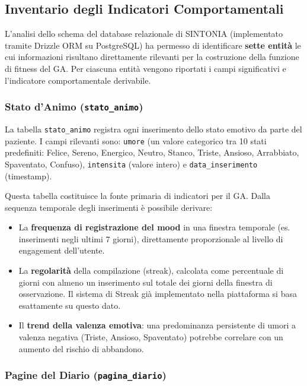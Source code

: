 \subsection{Inventario degli Indicatori Comportamentali}
\label{subsec:inventario_indicatori}

L'analisi dello schema del database relazionale di SINTONIA (implementato tramite Drizzle ORM su PostgreSQL) ha permesso di identificare \textbf{sette entità} le cui informazioni risultano direttamente rilevanti per la costruzione della funzione di fitness del GA. Per ciascuna entità vengono riportati i campi significativi e l'indicatore comportamentale derivabile.

\subsubsection{Stato d'Animo (\texttt{stato\_animo})}

La tabella \texttt{stato\_animo} registra ogni inserimento dello stato emotivo da parte del paziente. I campi rilevanti sono: \texttt{umore} (un valore categorico tra 10 stati predefiniti: Felice, Sereno, Energico, Neutro, Stanco, Triste, Ansioso, Arrabbiato, Spaventato, Confuso), \texttt{intensita} (valore intero) e \texttt{data\_inserimento} (timestamp).

Questa tabella costituisce la fonte primaria di indicatori per il GA. Dalla sequenza temporale degli inserimenti è possibile derivare:
\begin{itemize}
    \item La \textbf{frequenza di registrazione del mood} in una finestra temporale (es. inserimenti negli ultimi 7 giorni), direttamente proporzionale al livello di engagement dell'utente.
    \item La \textbf{regolarità} della compilazione (streak), calcolata come percentuale di giorni con almeno un inserimento sul totale dei giorni della finestra di osservazione. Il sistema di Streak già implementato nella piattaforma si basa esattamente su questo dato.
    \item Il \textbf{trend della valenza emotiva}: una predominanza persistente di umori a valenza negativa (Triste, Ansioso, Spaventato) potrebbe correlare con un aumento del rischio di abbandono.
\end{itemize}

\subsubsection{Pagine del Diario (\texttt{pagina\_diario})}

